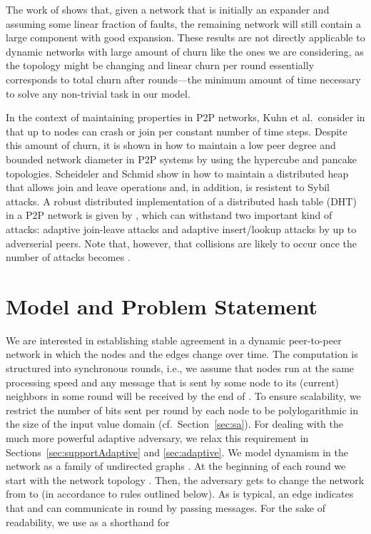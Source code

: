 \documentclass[leqno,11pt]{article}
\begin{document}
The work of \cite{BBCES2006} shows that, given a network that is initially
an expander and assuming some linear fraction of faults, the remaining
network will still contain a large component with good expansion.  These
results are not directly applicable to dynamic networks with large amount
of churn like the ones we are considering, as the topology might be
changing and linear churn per round essentially corresponds to
 total churn after  rounds---the minimum amount
of time necessary to solve any non-trivial task in our model.

In the context of maintaining properties in P2P networks, Kuhn et al.\
consider in \cite{KSW10} that up to  nodes can crash or join per constant number of time
steps. Despite this amount of churn, it is shown in \cite{KSW10} how to maintain a low peer
degree and bounded network diameter in P2P systems by using the hypercube and
pancake topologies.  Scheideler and Schmid show in \cite{SS09} how to maintain a
distributed heap that allows join and leave operations and, in addition, is
resistent to Sybil attacks. A robust distributed implementation of a distributed
hash table (DHT) in a P2P network is given by \cite{AS09}, which can withstand
two important kind of attacks: adaptive join-leave attacks and adaptive
insert/lookup attacks by up to  adverserial peers. 
Note that, however, that collisions are likely to occur once the number of attacks becomes .




\section{Model and Problem Statement} \label{sec:model}

We are interested in establishing  stable agreement in a
dynamic peer-to-peer network in which the nodes and the edges change over time.
The computation is structured into synchronous rounds, i.e., we assume that
nodes run at the same processing speed and any message that is sent by some node
 to its (current) neighbors in some round  will be received by the end of .
To ensure scalability, we restrict the number of bits sent per round by each
node to be polylogarithmic in the size of the input value domain (cf.\
Section~\ref{sec:sa}). For dealing with the
much more powerful adaptive adversary, we relax this requirement in
Sections~\ref{sec:supportAdaptive} and \ref{sec:adaptive}.
We model dynamism in the network as a family of undirected graphs . At the beginning of each round  we start with the network topology
. Then, the adversary gets to change the network from  to
 (in accordance to rules outlined below). 
As is typical, an
edge  indicates that  and  can communicate in round  by
 passing messages. 
For the sake of
readability, we use  as a shorthand for
 
\end{document}
